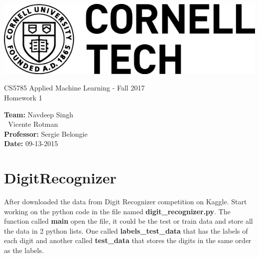 \documentclass[11pt,letterpaper]{article}
\begin{document}
\lstset{language=SQL}
\newpage
 \includegraphics[scale=0.9]{img/logo.png}
\vspace*{7cm}
\begin{center}
\Large{CS5785 Applied Machine Learning - Fall 2017} \\
\vspace{3mm}
\huge{Homework 1}
\end{center}

\vfill
\begin{flushright}
\begin{minipage}{.45\linewidth}
\textbf{Team:} \hspace{5.5em} Navdeep Singh\\
\textcolor{white}{.} \hspace{8.1em} Vicente Rotman\\
\textbf{Professor:} \hspace{3.9em} Sergie Belongie\\
\textbf{Date:} \hspace{6.2em}09-13-2015 
\end{minipage}
\end{flushright}
\newpage


\section{DigitRecognizer}
After downloaded the data from Digit Recognizer competition on Kaggle. Start working on the python code in the file named \textbf{digit\_recognizer.py}. The function called \textbf{main} open the file, it could be the test or train data and store all the data in 2 python lists. One called \textbf{labels\_test\_data} that has the labels of each digit and another called \textbf{test\_data} that stores the digits in the same order as the labels.
\end{document}
